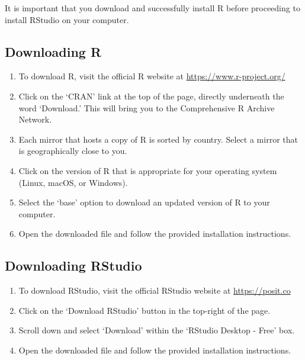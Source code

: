 \documentclass[
  letterpaper,
]{krantz}
\providecommand{\tightlist}{%
  \setlength{\itemsep}{0pt}\setlength{\parskip}{0pt}}\usepackage{longtable,booktabs,array}
\begin{document}
\begin{tcolorbox}[enhanced jigsaw, left=2mm, toprule=.15mm, opacitybacktitle=0.6, leftrule=.75mm, bottomrule=.15mm, colbacktitle=quarto-callout-important-color!10!white, breakable, colback=white, bottomtitle=1mm, toptitle=1mm, title=\textcolor{quarto-callout-important-color}{\faExclamation}\hspace{0.5em}{Important}, coltitle=black, titlerule=0mm, arc=.35mm, opacityback=0, colframe=quarto-callout-important-color-frame, rightrule=.15mm]

It is important that you download and successfully install R before
proceeding to install RStudio on your computer.

\end{tcolorbox}

\hypertarget{downloading-r}{%
\subsection{Downloading R}\label{downloading-r}}

\begin{enumerate}
\def\labelenumi{\arabic{enumi}.}
\tightlist
\item
  To download R, visit the official R website at
  \url{https://www.r-project.org/}
\item
  Click on the `CRAN' link at the top of the page, directly underneath
  the word `Download.' This will bring you to the Comprehensive R
  Archive Network.
\item
  Each mirror that hosts a copy of R is sorted by country. Select a
  mirror that is geographically close to you.
\item
  Click on the version of R that is appropriate for your operating
  system (Linux, macOS, or Windows).
\item
  Select the `base' option to download an updated version of R to your
  computer.
\item
  Open the downloaded file and follow the provided installation
  instructions.
\end{enumerate}

\hypertarget{downloading-rstudio}{%
\subsection{Downloading RStudio}\label{downloading-rstudio}}

\begin{enumerate}
\def\labelenumi{\arabic{enumi}.}
\tightlist
\item
  To download RStudio, visit the official RStudio website at
  \url{https://posit.co}
\item
  Click on the `Download RStudio' button in the top-right of the page.
\item
  Scroll down and select `Download' within the `RStudio Desktop - Free'
  box.
\item
  Open the downloaded file and follow the provided installation
  instructions.
\end{enumerate}
\end{document}
